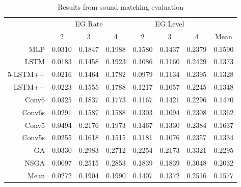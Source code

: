 \begin{table}[p]
\centering
\begin{tabular}{r|ccc|ccc|c}
\toprule
{} & \multicolumn{3}{c}{EG Rate} & \multicolumn{3}{c}{EG Level} & {} \\
{} & 2 & 3 & 4 & 2 & 3 & 4 & Mean \\
\midrule
MLP      &     0.0310 &     0.1847 &     0.1988 &      0.1580 &      0.1437 &      0.2379 &   0.1590 \\
LSTM     &     0.0183 &     0.1458 &     0.1923 &      0.1086 &      0.1160 &      0.2429 &   0.1373 \\
5-LSTM++ &     0.0216 &     0.1464 &     0.1782 &      0.0979 &      0.1134 &      0.2395 &   0.1328 \\
LSTM++   &     0.0223 &     0.1555 &     0.1788 &      0.1217 &      0.1057 &      0.2245 &   0.1348 \\
Conv6    &     0.0325 &     0.1837 &     0.1773 &      0.1167 &      0.1421 &      0.2296 &   0.1470 \\
Conv6s   &     0.0291 &     0.1587 &     0.1588 &      0.1303 &      0.1094 &      0.2308 &   0.1362 \\
Conv5    &     0.0494 &     0.2176 &     0.1973 &      0.1467 &      0.1330 &      0.2384 &   0.1637 \\
Conv5s   &     0.0255 &     0.1618 &     0.1515 &      0.1181 &      0.1076 &      0.2357 &   0.1334 \\
GA       &     0.0330 &     0.2983 &     0.2712 &      0.2254 &      0.2173 &      0.3321 &   0.2295 \\
NSGA     &     0.0097 &     0.2515 &     0.2853 &      0.1839 &      0.1839 &      0.3048 &   0.2032 \\
\midrule
Mean  &     0.0272 &     0.1904 &     0.1990 &      0.1407 &      0.1372 &      0.2516 &   0.1577 \\
\bottomrule
\end{tabular}
\caption{Results from sound matching evaluation}
\label{tbl:param_eval_eg}
\end{table}

